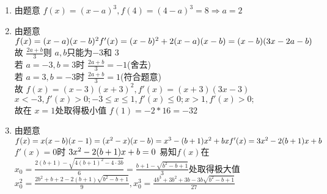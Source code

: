 \documentclass[class=ctexart,crop=false]{standalone}
\begin{document}
    \begin{enumerate}[label=(\arabic*)]
        \item 由题意 $f(x)=(x-a)^3,f(4)=(4-a)^3=8\Rightarrow a=2$
        \item 由题意 $f(x)=(x-a)(x-b)^2\\
            f'(x)=(x-b)^2+2(x-a)(x-b)=(x-b)(3x-2a-b)$\\
            故 $\frac{2a+b}{3}$则 $a,b$只能为$-3$和 $3$\\
            若 $a=-3,b=3$时 $\frac{2a+b}{3}=-1$(舍去)\\
            若 $a=3,b=-3$时 $\frac{2a+b}{3}=1$(符合题意)\\
            故 $f(x)=(x-3)(x+3)^2,f'(x)=(x+3)(3x-3)$\\
            $x<-3,f'(x)>0;-3\leqslant x \leqslant 1,f'(x)\leqslant 0;x>1,f'(x)>0;$\\
            故在 $x=1$处取得极小值 $f(1)=-2*16=-32$            
        \item 由题意 $f(x)=x(x-b)(x-1)=(x^2-x)(x-b)=x^3-(b+1)x^2+bx\\
        f'(x)=3x^2-2(b+1)x+b$\\
        $f'(x)=0$时 $3x^2-2(b+1)x+b=0\\$
        易知$f(x)$在$x_0=\frac{2(b+1)-\sqrt{4(b+1)^2-4\cdot 3b}}{6}
        =\frac{b+1-\sqrt{b^2-b+1}}{3}$处取得极大值\\
        $x_0^2=\frac{2b^2+b+2-2(b+1)\sqrt{b^2-b+1}}{9}, x_0^3=\frac{4b^3+3b^2+3b-3b\sqrt{b^2-b+1}}{27}$
    \end{enumerate}
\end{document}
